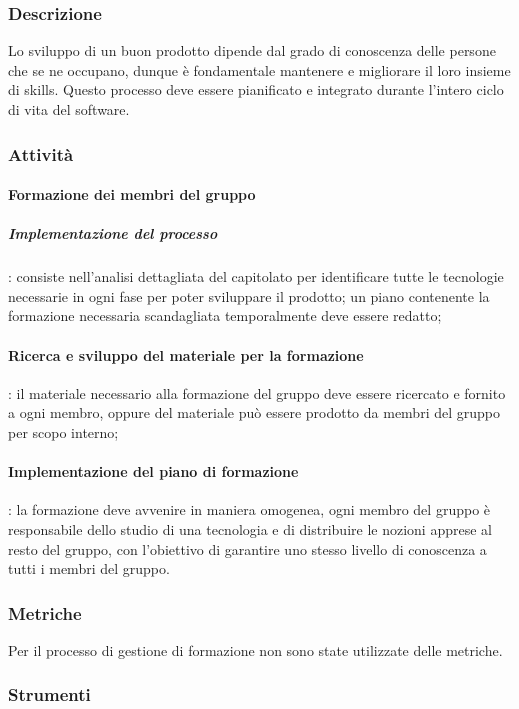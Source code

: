 \subsubsection{Descrizione}
Lo sviluppo di un buon prodotto dipende dal grado di conoscenza delle persone che se ne occupano, dunque è fondamentale mantenere e migliorare il loro insieme di skills.
Questo processo deve essere pianificato e integrato durante l'intero ciclo di vita del software.

\subsubsection{Attività}

\paragraph{Formazione dei membri del gruppo}
\subparagraph*{Implementazione del processo}: consiste nell'analisi dettagliata del capitolato per identificare tutte le tecnologie necessarie in ogni fase per poter sviluppare il prodotto; un piano contenente la formazione necessaria scandagliata temporalmente deve essere redatto;
\paragraph{Ricerca e sviluppo del materiale per la formazione}: il materiale necessario alla formazione del gruppo deve essere ricercato e fornito a ogni membro, oppure del materiale può essere prodotto da membri del gruppo per scopo interno;
\paragraph{Implementazione del piano di formazione}: la formazione deve avvenire in maniera omogenea, ogni membro del gruppo è responsabile dello studio di una tecnologia e di distribuire le nozioni apprese al resto del gruppo, con l'obiettivo di garantire uno stesso livello di conoscenza a tutti i membri del gruppo.

\subsubsection{Metriche} 
Per il processo di gestione di formazione non sono state utilizzate delle metriche.

\subsubsection{Strumenti} 
